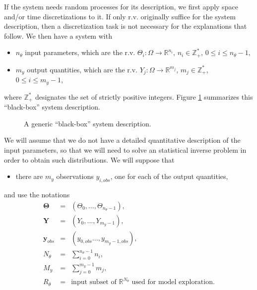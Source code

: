 If the system needs random processes for its description, we first apply space and/or time discretizations to it. 
If only r.v. originally suffice for the system description, then a discretization task is not necessary for the explanations that follow.
We then have a system with
\begin{itemize}
\item $n_{\theta}$ input parameters, which are the r.v. $\Theta_i:\Omega\rightarrow\mathbb{R}^{n_i}$, $n_i\in\mathbb{Z}_+^*$, $0\leqslant i\leqslant n_{\theta}-1$,
\item $m_{y}$ output quantities, which are the r.v. $Y_j:\Omega\rightarrow\mathbb{R}^{m_j}$, $m_j\in\mathbb{Z}_+^*$, $0\leqslant i\leqslant m_{y}-1$,
\end{itemize}
where $\mathbb{Z}_+^*$ designates the set of strictly positive integers.
Figure \ref{fig-black-box} summarizes this ``black-box'' system description.

\begin{figure}
\caption{A generic ``black-box'' system description.}
\label{fig-black-box}
\end{figure}

We will assume that we do not have a detailed quantitative description of the input parameters, so that we will need to solve an statistical inverse problem
in order to obtain such distributions. 
We will suppose that
\begin{itemize}
\item there are $m_{y}$ observations $y_{i,obs}$, one for each of the output quantities,
\end{itemize}
and use the notations
\begin{eqnarray*}
\boldsymbol{\Theta} & =      & (\Theta_0,\ldots,\Theta_{n_\theta-1}), \\
\mathbf{Y}          & =      & (Y_0,     \ldots,Y_{m_y-1}          ), \\
\mathbf{y}_{obs}    & =      & (y_{0,obs}\ldots,y_{m_y-1,obs}      ), \\
N_{\theta}          & =      & \sum_{i=0}^{n_{\theta}-1}n_i,          \\
M_y                 & =      & \sum_{j=0}^{m_y       -1}m_j,          \\
R_{\theta}          & =      & \mbox{input subset of }\mathbb{R}^{N_{\theta}}\mbox{ used for model exploration}.
\end{eqnarray*}

